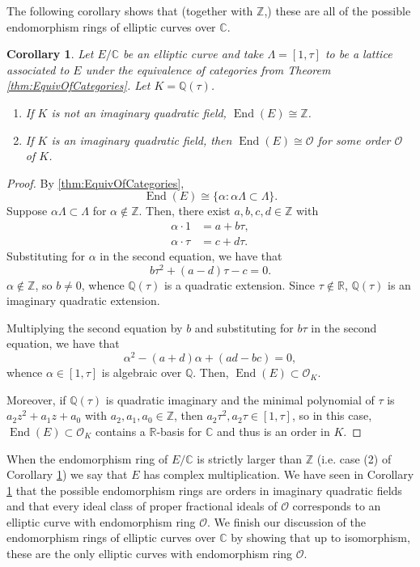 \documentclass{amsart}
\newtheorem{cor}[thm]{Corollary}
\theoremstyle{definition}
\theoremstyle{remark}
\numberwithin{equation}{section}
\newcommand{\cO}{\mathcal O}
\newcommand{\bbC}{\mathbb C}
\newcommand{\bbQ}{\mathbb Q}
\newcommand{\bbR}{\mathbb R}
\newcommand{\bbZ}{\mathbb Z}
\DeclareMathOperator{\End}{End}
\begin{document}
 The following corollary shows that (together with $\bbZ$,) these are all of the possible endomorphism rings of elliptic curves over $\bbC$.
 
 \begin{cor} \label{cor:EndoRingsOverC}
 Let $E/\bbC$ be an elliptic curve and take $\Lambda = [1,\tau]$ to be a  lattice associated to $E$ under the equivalence of categories from Theorem \ref{thm:EquivOfCategories}. Let $K = \bbQ(\tau)$.
 \begin{enumerate}
 \item If $K$ is not an imaginary quadratic field, $\End(E) \cong \bbZ$.
 \item If $K$ is an imaginary quadratic field, then $\End(E) \cong \cO$ for some order $\cO$ of $K$.
 \end{enumerate}
 \end{cor}

\begin{proof}
 By \ref{thm:EquivOfCategories}, 
 \[
 \End(E) \cong \{\alpha: \alpha\Lambda \subset \Lambda\}.
 \]
 Suppose $\alpha \Lambda \subset \Lambda$ for $\alpha \notin \bbZ$. Then, there exist $a, b, c, d \in \bbZ$ with 
 \begin{align*}
 \alpha \cdot 1 &= a + b\tau, \\
 \alpha \cdot \tau &= c + d\tau.
 \end{align*}
  Substituting for $\alpha$ in the second equation, we have that 
  \[
  b\tau^2 + (a - d) \tau - c = 0.
  \]
  $\alpha \notin \bbZ$, so $b \neq 0$, whence $\bbQ(\tau)$ is a quadratic extension. Since $\tau \notin \bbR$, $\bbQ(\tau)$ is an imaginary quadratic extension. 
  
  Multiplying the second equation by $b$ and substituting for $b \tau$ in the second equation, we have that
  \[
  \alpha^2 - (a + d) \alpha + (ad - bc) = 0,
  \]
 whence $\alpha \in [1,\tau]$ is algebraic over $\bbQ$. Then, $\End(E) \subset \cO_{K}$. 
 
 Moreover, if $\bbQ(\tau)$ is quadratic imaginary and the minimal polynomial of $\tau$ is $a_2 z^2 + a_1 z + a_0$ with $a_2, a_1, a_0 \in \bbZ$, then $a_2 \tau^2, a_2 \tau \in [1,\tau]$, so in this case, $\End(E) \subset \cO_{K}$ contains a $\bbR$-basis for $\bbC$ and thus is an order in $K$. 
\end{proof}

 When the endomorphism ring of $E/\bbC$ is strictly larger than $\bbZ$ (i.e. case (2) of Corollary \ref{cor:EndoRingsOverC}) we say that $E$ has complex multiplication. 
 We have seen in Corollary \ref{cor:EndoRingsOverC} that the possible endomorphism rings are orders in imaginary quadratic fields and that every ideal class of proper fractional ideals of $\cO$ corresponds to an elliptic curve with endomorphism ring $\cO$. We finish our discussion of the endomorphism rings of elliptic curves over $\bbC$ by showing that up to isomorphism, these are the only elliptic curves with endomorphism ring $\cO$.
 
\end{document}
